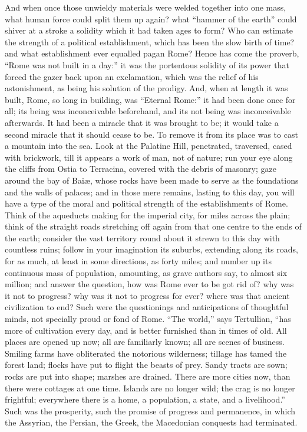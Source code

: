 And when once those unwieldy materials were welded together into
one mass, what human force could split them up again? what
``hammer of the earth'' could shiver at a stroke a solidity
which it had taken ages to form? Who can estimate the strength of a
political establishment, which has been the slow birth of time?
and what establishment ever equalled pagan Rome? Hence has come the
proverb, ``Rome was not built in a day:'' it was the
portentous solidity of its power that forced the gazer back upon an
exclamation, which was the relief of his astonishment, as being his
solution of the prodigy. And, when at length it was built, Rome, so
long in building, was ``Eternal Rome:'' it had been done once
for all; its being was inconceivable beforehand, and its not being was
inconceivable afterwards. It had been a miracle that it was brought to
be; it would take a second miracle that it should cease to be. To
remove it from its place was to cast a mountain into the sea. Look at
the Palatine Hill, penetrated, traversed, cased with brickwork, till
it appears a work of man, not of nature; run your eye along the cliffs
from Ostia to Terracina, covered with the debris of masonry; gaze
around the bay of Baiæ, whose rocks have been made to serve as the
foundations and the walls of palaces; and in those mere remains,
lasting to this day, you will have a type of the moral and political
strength of the establishments of Rome. Think of the aqueducts making
for the imperial city, for miles across the plain; think of the
straight roads stretching off again from that one centre to the ends
of the earth; consider the vast territory round about it strewn to
this day with countless ruins; follow in your imagination its suburbs,
extending along its roads, for as much, at least in some directions,
as forty miles; and number up its continuous mass of population,
amounting, as grave authors say, to almost six million; and answer the
question, how was Rome ever to be got rid of? why was it not to
progress? why was it not to progress for ever? where was that ancient
civilization to end? Such were the questionings and
anticipations of thoughtful minds, not specially proud or fond of
Rome. ``The world,'' says Tertullian, ``has more of
cultivation every day, and is better furnished than in times of old.
All places are opened up now; all are familiarly known; all are scenes
of business. Smiling farms have obliterated the notorious wilderness;
tillage has tamed the forest land; flocks have put to flight the
beasts of prey. Sandy tracts are sown; rocks are put into shape;
marshes are drained. There are more cities now, than there were
cottages at one time. Islands are no longer wild; the crag is no
longer frightful; everywhere there is a home, a population, a state,
and a livelihood.'' Such was the prosperity, such the promise of
progress and permanence, in which the Assyrian, the Persian, the
Greek, the Macedonian conquests had terminated.

